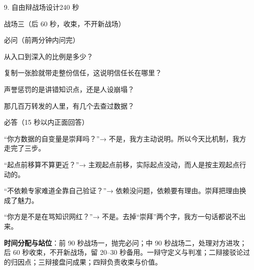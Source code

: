 \documentclass[script,con]{debate}
\begin{document}
\begin{stage}{9. 自由辩战场设计}{240 秒}
\begin{battleground}{战场三（后 60 秒，收束，不开新战场）}
\begin{points}{必问（前两分钟内问完）}
\item 从入口到深入的比例是多少？
\item 复制一张脸就带走整份信任，这说明信任长在哪里？
\item 声誉惩罚的是讲错知识点，还是人设崩塌？
\item 那几百万转发的人里，有几个去查过数据？
\end{points}
\begin{points}{必答（15 秒以内正面回答）}
\item “你方数据的自变量是崇拜吗？”→ 不是，我方主动说明。所以今天比机制，我方走完了三步。
\item “起点前移算不算更近？”→ 主观起点前移，实际起点没动，而人是按主观起点行动的。
\item “不依赖专家难道全靠自己验证？”→ 依赖没问题，依赖要有理由。崇拜把理由换成了魅力。
\item “你方是不是在骂知识网红？”→ 不是。去掉“崇拜”两个字，我方一句话都说不出来。
\end{points}
\textbf{时间分配与站位}：前 90 秒战场一，抛完必问；中 90 秒战场二，处理对方进攻；后 60 秒收束，不开新战场，留 20–30 秒备用。一辩守定义与判准；二辩接驳论过的归因点；三辩接盘问成果；四辩负责收束与价值。

\end{battleground}
\end{stage}
\end{document}
